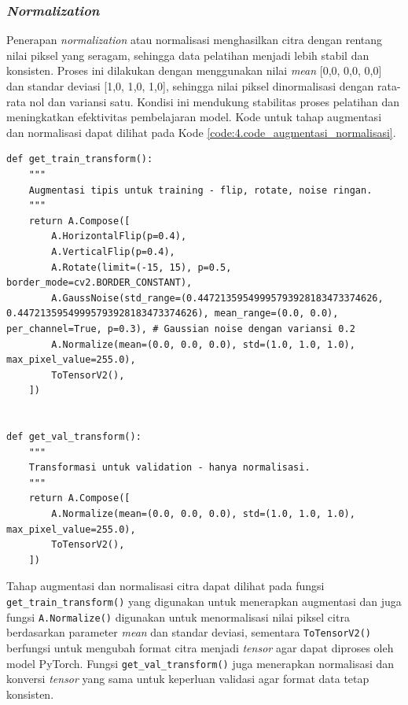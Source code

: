 
\subsubsection{\textit{Normalization}}
Penerapan \textit{normalization} atau normalisasi menghasilkan citra dengan rentang nilai piksel yang seragam, sehingga data pelatihan menjadi lebih stabil dan konsisten. Proses ini dilakukan dengan menggunakan nilai \textit{mean} [0{,}0, 0{,}0, 0{,}0] dan standar deviasi [1{,}0, 1{,}0, 1{,}0], sehingga nilai piksel dinormalisasi dengan rata-rata nol dan variansi satu. Kondisi ini mendukung stabilitas proses pelatihan dan meningkatkan efektivitas pembelajaran model. Kode untuk tahap augmentasi dan normalisasi dapat dilihat pada Kode \ref{code:4.code_augmentasi_normalisasi}. \par

\begin{lstlisting}[caption={Proses Augmentasi dan Normalisasi}, label={code:4.code_augmentasi_normalisasi}]
def get_train_transform():
    """
    Augmentasi tipis untuk training - flip, rotate, noise ringan.
    """
    return A.Compose([
        A.HorizontalFlip(p=0.4),
        A.VerticalFlip(p=0.4),
        A.Rotate(limit=(-15, 15), p=0.5, border_mode=cv2.BORDER_CONSTANT),
        A.GaussNoise(std_range=(0.44721359549995793928183473374626, 0.44721359549995793928183473374626), mean_range=(0.0, 0.0), per_channel=True, p=0.3), # Gaussian noise dengan variansi 0.2
        A.Normalize(mean=(0.0, 0.0, 0.0), std=(1.0, 1.0, 1.0), max_pixel_value=255.0),
        ToTensorV2(),
    ])


def get_val_transform():
    """
    Transformasi untuk validation - hanya normalisasi.
    """
    return A.Compose([
        A.Normalize(mean=(0.0, 0.0, 0.0), std=(1.0, 1.0, 1.0), max_pixel_value=255.0),
        ToTensorV2(),
    ])

\end{lstlisting}

Tahap augmentasi dan normalisasi citra dapat dilihat pada fungsi \texttt{get\_train\_transform()} yang digunakan untuk menerapkan augmentasi dan juga fungsi \texttt{A.Normalize()} digunakan untuk menormalisasi nilai piksel citra berdasarkan parameter \textit{mean} dan standar deviasi, sementara \texttt{ToTensorV2()} berfungsi untuk mengubah format citra menjadi \textit{tensor} agar dapat diproses oleh model PyTorch. Fungsi \texttt{get\_val\_transform()} juga menerapkan normalisasi dan konversi \textit{tensor} yang sama untuk keperluan validasi agar format data tetap konsisten. \par

